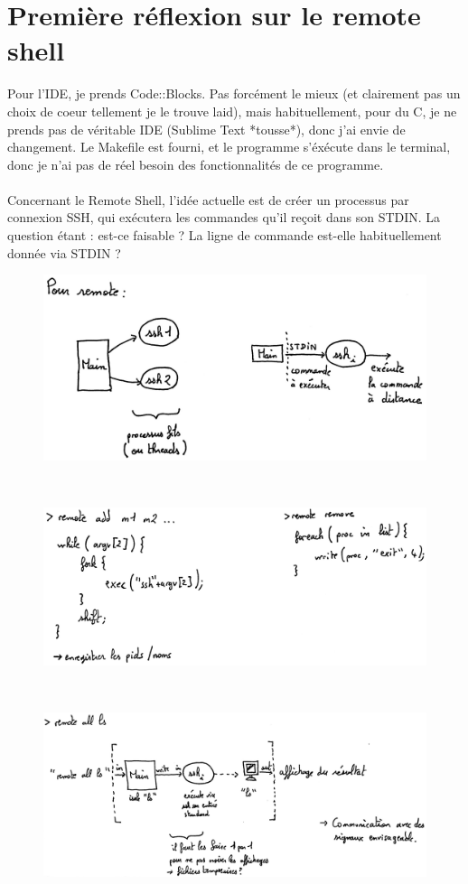 \chapter[Réflexion]{Première réflexion sur le remote shell}
Pour l'IDE, je prends Code::Blocks. Pas forcément le mieux (et clairement pas un choix de coeur tellement je le trouve laid), mais habituellement, pour du C, je ne prends pas de véritable IDE (Sublime Text *tousse*), donc j'ai envie de changement. Le Makefile est fourni, et le programme s'éxécute dans le terminal, donc je n'ai pas de réel besoin des fonctionnalités de ce programme.
\\\\
Concernant le Remote Shell, l'idée actuelle est de créer un processus par connexion SSH, qui exécutera les commandes qu'il reçoit dans son STDIN. La question étant : est-ce faisable ? La ligne de commande est-elle habituellement donnée via STDIN ?
\\\begin{figure}[!htp]
\centering
\includegraphics[width=400pt]{Axel-02_Manuscrit1.jpg}
\end{figure}
\\\begin{figure}[!htp]
\centering
\includegraphics[width=400pt]{Axel-02_Manuscrit2.jpg}
\end{figure}
\\\begin{figure}[!htp]
\centering
\includegraphics[width=400pt]{Axel-02_Manuscrit3.jpg}
\end{figure}
